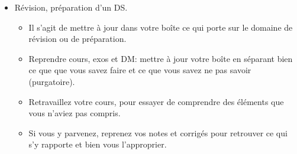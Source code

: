 \begin{itemize}
 \item Révision, préparation d'un DS.
 \begin{itemize}
  \item Il s'agit de mettre à jour dans votre boîte ce qui porte sur le domaine de révision ou de préparation. 
  \item Reprendre cours, exos et DM: mettre à jour votre boîte en séparant bien ce que que vous savez faire et ce que vous savez ne pas savoir (purgatoire).
  \item Retravaillez votre cours, pour essayer de comprendre des éléments que vous n'aviez pas compris.
  \item Si vous y parvenez, reprenez vos notes et corrigés pour retrouver ce qui s'y rapporte et bien vous l'approprier.
 \end{itemize}

\end{itemize}



